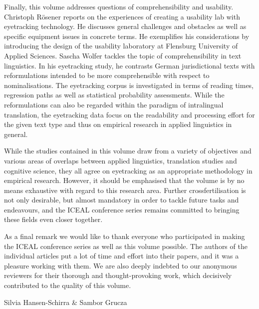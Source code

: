 \begin{styleTextbody}
Finally, this volume addresses questions of comprehensibility and usability. Christoph Rösener reports on the experiences of creating a usability lab with eyetracking technology. He discusses general challenges and obstacles as well as specific equipment issues in concrete terms. He exemplifies his considerations by introducing the design of the usability laboratory at Flensburg University of Applied Sciences. Sascha Wolfer tackles the topic of comprehensibility in text linguistics. In his eyetracking study, he contrasts German jurisdictional texts with reformulations intended to be more comprehensible with respect to nominalisations. The eyetracking corpus is investigated in terms of reading times, regression paths as well as statistical probability assessments. While the reformulations can also be regarded within the paradigm of intralingual translation, the eyetracking data focus on the readability and processing effort for the given text type and thus on empirical research in applied linguistics in general.
\end{styleTextbody}

\begin{styleTextbody}
While the studies contained in this volume draw from a variety of objectives and various areas of overlaps between applied linguistics, translation studies and cognitive science, they all agree on eyetracking as an appropriate methodology in empirical research. However, it should be emphasised that the volume is by no means exhaustive with regard to this research area. Further crossfertilisation is not only desirable, but almost mandatory in order to tackle future tasks and endeavours, and the ICEAL conference series remains committed to bringing these fields even closer together. 
\end{styleTextbody}

\begin{styleTextbody}
As a final remark we would like to thank everyone who participated in making the ICEAL conference series as well as this volume possible. The authors of the individual articles put a lot of time and effort into their papers, and it was a pleasure working with them. We are also deeply indebted to our anonymous reviewers for their thorough and thought-provoking work, which decisively contributed to the quality of this volume.
\end{styleTextbody}

\begin{styleTextbody}
Silvia Hansen-Schirra \& Sambor Grucza
\end{styleTextbody}
